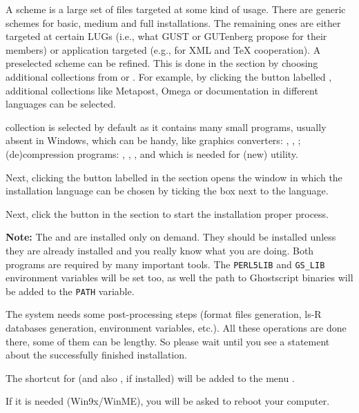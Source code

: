 \documentclass{article}
\begin{document}
A scheme is a large set of files targeted at some kind of usage. There are 
generic schemes for basic, medium and full installations. The remaining ones
are either targeted  at certain LUGs (i.e., what GUST or GUTenberg propose
for their members) or application targeted (e.g., for XML and \TeX{}
cooperation).  A preselected scheme can be refined. This is done in the 
 section by choosing additional collections from 
 or . For example, 
by clicking the  button labelled , additional collections like Metapost, Omega or documentation 
in different languages can be selected.

 collection is selected by default as it contains many small
programs, usually absent in Windows, which can be handy, like graphics
converters: , , ;
(de)compression programs: , , ,
and  which is needed for  (new)
utility.

Next, clicking the  button labelled  in the  section opens the
 window in which the installation language can
be chosen by ticking the box next to the language.

Next, click the  button in the  section to 
start the installation proper process.

\textbf{Note:} The  and  are installed only
on demand. They should be installed unless they are already installed and you
really know what you are doing. Both programs are required by many important
tools. The \verb|PERL5LIB| and \verb|GS_LIB| environment variables will be
set too, as well the path to Ghostscript binaries will be added to the
\verb|PATH| variable.

The \TL{} system  needs some post-processing  steps (format files
generation,  ls-R  databases generation, environment variables, etc.). All
these operations are done there, some of them can be lengthy. So please wait
until you see a statement about the successfully finished installation.

The shortcut for  (and also , if installed)
will be added to the menu .

If it is needed (Win9x/WinME), you will be asked to reboot your computer.
\end{document}
